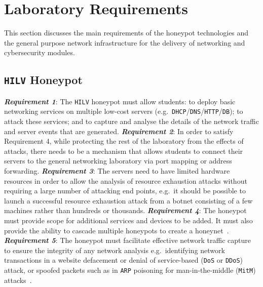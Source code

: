 \documentclass[10pt,journal]{IEEEtran}
\begin{document}
\section{Laboratory Requirements}\label{sec:TeachingRequire}

This section discusses the main requirements of the honeypot technologies and the general purpose network infrastructure for the delivery of networking and cybersecurity modules.

\subsection{\texttt{HILV} Honeypot}\label{subsec:ResearchHoneypot}

\noindent\textit{\textbf{Requirement 1}}:
The \texttt{HILV} honeypot must allow students: to deploy basic networking services
on multiple low-cost servers
(e.g.\ \texttt{DHCP}/\texttt{DNS}/\texttt{HTTP}/\texttt{DB}); to attack these
services; and to capture and analyse the details of the network traffic
and server events that are generated.
\newline\newline
\noindent\textit{\textbf{Requirement 2}}:
In order to satisfy Requirement 4, while protecting the rest of the laboratory
from the effects of attacks, there needs to be a mechanism that allows students
to connect their servers to the general networking laboratory via port mapping
or address forwarding.
\newline\newline
\noindent\textit{\textbf{Requirement 3}}:
The servers need to have limited hardware resources in order to allow the
analysis of resource exhaustion attacks without requiring a large number of
attacking end points, e.g.\ it should be possible to launch a successful
resource exhaustion attack from a botnet consisting of a few machines rather
than hundreds or thousands.
\newline\newline
\noindent\textit{\textbf{Requirement 4}}:
The honeypot must provide scope for additional services and devices to be
added. It must also provide the ability to cascade multiple honeypots to create
a honeynet~\cite{AA:15,FDF:15,KNC:15}.
\newline\newline
\noindent\textit{\textbf{Requirement 5}}:
The honeypot must facilitate effective network traffic capture to ensure the
integrity of any network analysis e.g.\ identifying network transactions in a
website defacement or denial of service-based (\texttt{DoS} or \texttt{DDoS})
attack, or spoofed packets such as in \texttt{ARP} poisoning for
man-in-the-middle (\texttt{MitM}) attacks~\cite{PS:16,RSKA:16}.
\end{document}
